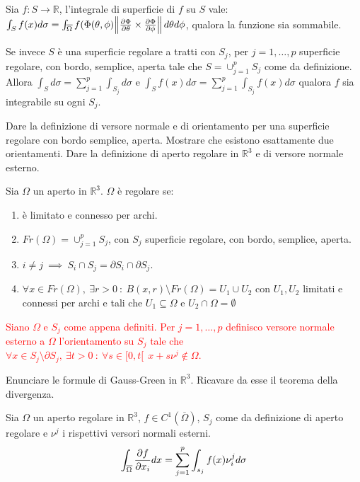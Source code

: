 \documentclass{exam}
\newcommand{\R}[0]{\mathbb{R}}
\newcommand{\err}[1]{\textcolor{red}{#1}}
\begin{document}
\begin{questions}
\begin{solution}
Sia $f: S \to \R$, l'integrale di superficie di $f$ su $S$ vale: $\int_{S}f(x) d\sigma = \int_{\overline{\Omega}} f(\Phi(\theta, \phi)\norm{\pdv{\Phi}{\theta} \times \pdv{\Phi}{\phi}} d\theta d\phi$, qualora la funzione sia sommabile.

Se invece $S$ è una superficie regolare a tratti con $S_j$, per $j=1 ,\dots, p $ superficie regolare, con bordo, semplice, aperta tale che $S = \cup_{j=1}^p S_j$ come da definizione.
Allora $\int_S d\sigma = \sum_{j=1}^p \int_{S_j} d\sigma$ e $\int_S f(x) d\sigma = \sum_{j=1}^p \int_{S_j} f(x) d\sigma$ qualora $f$ sia integrabile su ogni $S_j$.
\end{solution}

\question Dare la definizione di versore normale e di orientamento per una superficie regolare con bordo semplice, aperta. Mostrare che esistono esattamente due orientamenti.
\question Dare la definizione di aperto regolare in $\R^3$ e di versore normale esterno.

\begin{solution}
    Sia $\Omega$ un aperto in $\R^3$. $\Omega$ è regolare se:
    \begin{enumerate}
        \item è limitato e connesso per archi.
        \item $Fr(\Omega) = \cup_{j=1}^p S_j$, con $S_j$ superficie regolare, con bordo, semplice, aperta.
        \item $i \not= j \ \implies\  S_i \cap S_j = \partial S_i \cap \partial S_j$.
        \item $\forall x \in Fr(\Omega), \ \exists r>0 \ : \ B(x,r) \setminus Fr(\Omega) = U_1 \cup U_2$ con $U_1, U_2$ limitati e connessi per archi e tali che $U_1 \subseteq \Omega$ e $U_2 \cap \Omega = \emptyset$
    \end{enumerate}

\err{
Siano $\Omega$ e $S_j$ come appena definiti. Per $j=1,\dots,p$ definisco versore normale esterno a $\Omega$ l'orientamento su $S_j$ tale che $\forall x \in S_j \setminus \partial S_j, \ \exists t>0 \ : \ \forall s \in [0,t[ \ \  x+s\nu^j \not\in \Omega$.
}
\end{solution}

\question Enunciare le formule di Gauss-Green in $\R^3$. Ricavare da esse il teorema della divergenza.

\begin{solution}
    Sia $\Omega$ un aperto regolare in $\R^3$, $f\in C^1(\overline{\Omega})$, $S_j$ come da definizione di aperto regolare e $\nu^j$ i rispettivi versori normali esterni. 
    \[
    \int_{\overline{\Omega}} \pdv{f}{x_i} dx = \sum_{j=1}^p\int_{s_j} f(x) \nu^j_i d \sigma
    \]
    

\end{solution}
\end{questions}
\end{document}

